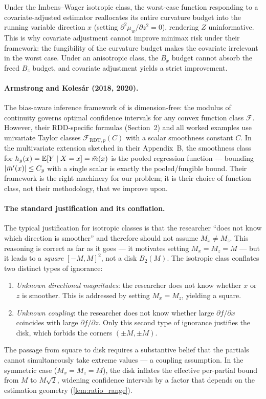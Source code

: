Under the Imbens--Wager isotropic class, the worst-case function responding to a covariate-adjusted estimator reallocates its entire curvature budget into the running variable direction $x$ (setting $\partial^2 \mu_w / \partial z^2 = 0$), rendering $Z$ uninformative.
This is why covariate adjustment cannot improve minimax risk under their framework: the fungibility of the curvature budget makes the covariate irrelevant in the worst case.
Under an anisotropic class, the $B_x$ budget cannot absorb the freed $B_z$ budget, and covariate adjustment yields a strict improvement.

\paragraph{Armstrong and Kolesár (2018, 2020).}
The bias-aware inference framework of \textcite{armstrong_optimal_2018} is dimension-free: the modulus of continuity governs optimal confidence intervals for any convex function class $\mathcal{F}$.
However, their RDD-specific formulas (Section~2) and all worked examples use univariate Taylor classes $\mathcal{F}_{\mathrm{RDT},p}(C)$ with a scalar smoothness constant $C$.
In the multivariate extension sketched in their Appendix~B, the smoothness class for $h_y(x) = \operatorname{\mathbb{E}}[Y \mid X = x] = \bar{m}(x)$ is the pooled regression function --- bounding $\lvert\bar{m}'(x)\rvert \leq C_y$ with a single scalar is exactly the pooled/fungible bound.
Their framework is the right machinery for our problem; it is their choice of function class, not their methodology, that we improve upon.

\paragraph{The standard justification and its conflation.}
The typical justification for isotropic classes is that the researcher ``does not know which direction is smoother'' and therefore should not assume $M_x \neq M_z$.
This reasoning is correct as far as it goes --- it motivates setting $M_x = M_z = M$ --- but it leads to a \emph{square} $[-M, M]^2$, not a disk $B_2(M)$.
The isotropic class conflates two distinct types of ignorance:
\begin{enumerate}
	\item \emph{Unknown directional magnitudes}: the researcher does not know whether $x$ or $z$ is smoother.
	This is addressed by setting $M_x = M_z$, yielding a square.
	\item \emph{Unknown coupling}: the researcher does not know whether large $\partial f / \partial x$ coincides with large $\partial f / \partial z$.
	Only this second type of ignorance justifies the disk, which forbids the corners $(\pm M, \pm M)$.
\end{enumerate}
The passage from square to disk requires a substantive belief that the partials cannot simultaneously take extreme values --- a coupling assumption.
In the symmetric case ($M_x = M_z = M$), the disk inflates the effective per-partial bound from $M$ to $M\sqrt{2}$, widening confidence intervals by a factor that depends on the estimation geometry (\cref{lem:ratio_range}).

